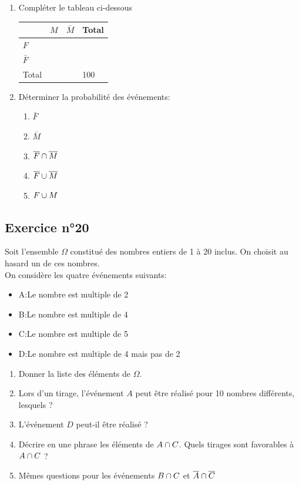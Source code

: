 \documentclass[12pt,a4paper]{article}
\begin{document}
\begin{enumerate}
    \item Compléter le tableau ci-dessous
    
    \begin{center}


\begin{tabular}{|p{2.5cm}|p{4cm}|p{4cm}|p{2.5cm}|} \hline
 & $M$ &$\bar{M}$& Total \\ \hline
$F$&  & & \\ \hline
 $\bar{F}$ & & & \\ \hline
Total & & & 100\\ \hline
\end{tabular} 
   
\end{center}

\item Déterminer la probabilité des événements:
\begin{enumerate}
    \item $\bar{F}$
    \item $\bar{M}$
    \item $\overline{F} \cap \overline{M}$
    \item $\overline{F} \cup \overline{M}$
    \item $F \cup M$
\end{enumerate}

\end{enumerate}


\subsection*{Exercice n°20}

Soit l'ensemble $\Omega$ constitué des nombres entiers de 1 à 20 inclus. On choisit au hasard un de ces nombres.\\
On considère les quatre événements suivants:

\begin{itemize}
    \item A:\og Le nombre est multiple de 2 \fg{}
    \item B:\og Le nombre est multiple de 4 \fg{}
    \item C:\og Le nombre est multiple de 5 \fg{}
    \item D:\og Le nombre est multiple de 4 mais pas de 2\fg{}
\end{itemize}

\begin{enumerate}
    \item Donner la liste des éléments de $\Omega$.
    \item Lors d'un tirage, l'événement $A$ peut être réalisé pour 10 nombres différents, lesquels ?
    \item L'événement $D$ peut-il être réalisé ?
    \item Décrire en une phrase les éléments de $A\cap C$. Quels tirages sont favorables à $A\cap C$ ?
    \item Mêmes questions pour les événements $B\cap C$ et $\overline{A}\cap \overline{C}$
\end{enumerate}
\end{document}
